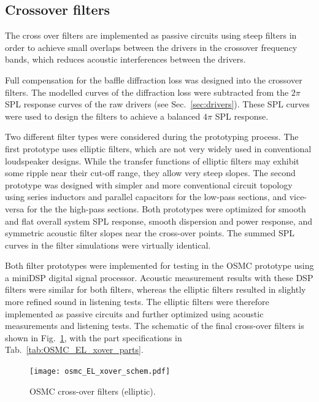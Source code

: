 \documentclass[12pt,a4paper]{article}
\providecommand{\figr}[1]{Fig.~\ref{fig:#1}}
\providecommand{\figlabel}[1]{\label{fig:#1}}
\providecommand{\tabl}[1]{Tab.~\ref{tab:#1}}
\providecommand{\sectn}[1]{Sec.~\ref{sec:#1}}
\providecommand{\seclabel}[1]{\label{sec:#1}}
\begin{document}
\subsection{Crossover filters}\seclabel{crossover_filters}

The cross over filters are implemented as passive circuits using steep filters in order to achieve small overlaps between the drivers in the crossover frequency bands, which reduces acoustic interferences between the drivers.

Full compensation for the baffle diffraction loss was designed into the crossover filters. The modelled curves of the diffraction loss were subtracted from the $2\pi$ SPL response curves of the raw drivers (see \sectn{drivers}). These SPL curves were used to design the filters to achieve a balanced $4\pi$ SPL response.\par

Two different filter types were considered during the prototyping process.\cite{osmc_p685} The first prototype uses elliptic filters, which are not very widely used in conventional loudspeaker designs. While the transfer functions of elliptic filters may exhibit some ripple near their cut-off range, they allow very steep slopes. The second prototype was designed with simpler and more conventional circuit topology using series inductors and parallel capacitors for the low-pass sections, and vice-versa for the the high-pass sections. Both prototypes were optimized for smooth and flat overall system SPL response, smooth dispersion and power response, and symmetric acoustic filter slopes near the cross-over points. The summed SPL curves in the filter simulations were virtually identical.

Both filter prototypes were implemented for testing in the OSMC prototype using a miniDSP digital signal processor. Acoustic measurement results with these DSP filters were similar for both filters, whereas the elliptic filters resulted in slightly more refined sound in listening tests\cite{osmc_p708}. The elliptic filters were therefore implemented as passive circuits and further optimized using acoustic measurements and listening tests. The schematic of the final cross-over filters is shown in \figr{osmc_EL_xover_schem}, with the part specifications in \tabl{OSMC_EL_xover_parts}.

\begin{figure}[p]
	\centering
	\texttt{[image: osmc\_EL\_xover\_schem.pdf]}
	\caption{OSMC cross-over filters (elliptic).}
	\figlabel{osmc_EL_xover_schem}
\end{figure}
\end{document}
